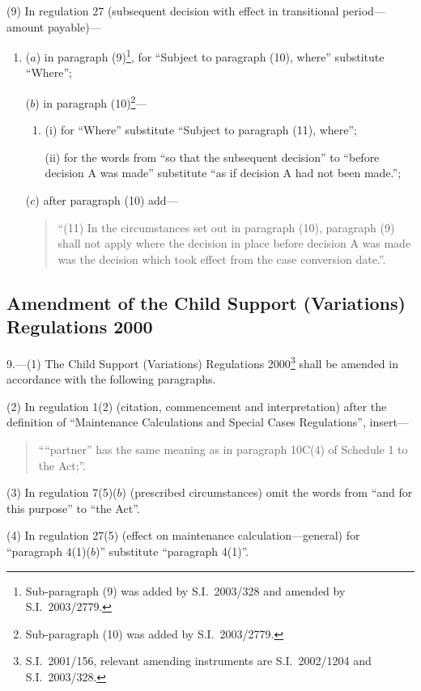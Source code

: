 \documentclass[12pt,a4paper]{article}
\begin{document}
(9) In regulation 27 (subsequent decision with effect in transitional period---amount payable)—
\begin{enumerate}\item[]
($a$) in paragraph (9)\footnote{Sub-paragraph (9) was added by S.I.\ 2003/328 and amended by S.I.\ 2003/2779.}, for “Subject to paragraph (10), where” substitute “Where”;

($b$) in paragraph (10)\footnote{Sub-paragraph (10) was added by S.I.\ 2003/2779.}—
\begin{enumerate}\item[]
(i) for “Where” substitute “Subject to paragraph (11), where”;

(ii) for the words from “so that the subsequent decision” to “before decision A was made” substitute “as if decision A had not been made.”;
\end{enumerate}

($c$) after paragraph (10) add—
\begin{quotation}
“(11) In the circumstances set out in paragraph (10), paragraph (9) shall not apply where the decision in place before decision A was made was the decision which took effect from the case conversion date.”.
\end{quotation}
\end{enumerate}

\subsection[9. Amendment of the Child Support (Variations) Regulations 2000]{Amendment of the Child Support (Variations) Regulations 2000}

9.---(1)  The Child Support (Variations) Regulations 2000\footnote{S.I.\ 2001/156, relevant amending instruments are S.I.\ 2002/1204 and S.I.\ 2003/328.} shall be amended in accordance with the following paragraphs.

(2) In regulation 1(2) (citation, commencement and interpretation) after the definition of “Maintenance Calculations and Special Cases Regulations”, insert—
\begin{quotation}
““partner” has the same meaning as in paragraph 10C(4) of Schedule 1 to the Act;”.
\end{quotation}

(3) In regulation 7(5)($b$)  (prescribed circumstances) omit the words from “and for this purpose” to “the Act”.

(4) In regulation 27(5) (effect on maintenance calculation—general) for “paragraph 4(1)($b$)” substitute “paragraph 4(1)”. 
\end{document}
